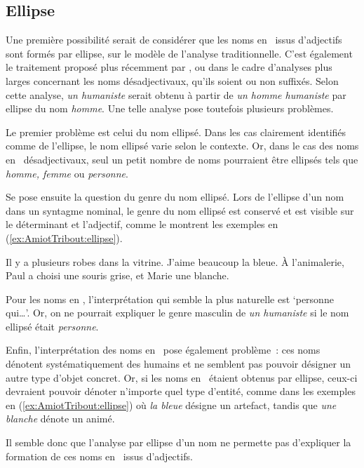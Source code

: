 \documentclass[output=paper]{LSP/langsci}
\begin{document}
\subsection{Ellipse}
Une première possibilité serait de considérer que les noms en \iste\ issus d'adjectifs sont formés par ellipse, sur le modèle de l'analyse traditionnelle. C'est également le traitement proposé plus récemment par \citet{borerroy10}, \citet{alexiadou13} ou \citet{mcnallydeswart15} dans le cadre d'analyses plus larges concernant les noms désadjectivaux, qu'ils soient ou non suffixés. Selon cette analyse, \textit{un humaniste} serait obtenu à partir de \textit{un homme humaniste} par ellipse du nom \textit{homme}. Une telle analyse pose toutefois plusieurs problèmes.

Le premier problème est celui du nom ellipsé. Dans les cas clairement identifiés comme de l'ellipse, le nom ellipsé varie selon le contexte. Or, dans le cas des noms en \iste\ désadjectivaux, seul un petit nombre de noms pourraient être ellipsés tels que \textit{homme, femme} ou \textit{personne}.

Se pose ensuite la question du genre du nom ellipsé. Lors de l'ellipse d'un nom dans un syntagme nominal, le genre du nom ellipsé est conservé et est visible  sur le déterminant et l'adjectif, comme le montrent les exemples en (\ref{ex:AmiotTribout:ellipse}).

\begin{exe}
\ex \label{ex:AmiotTribout:ellipse}
\begin{xlist}
\ex Il y a plusieurs robes dans la vitrine. J'aime beaucoup la bleue.
\ex À l'animalerie, Paul a choisi une souris grise, et Marie une blanche.
\end{xlist}
\end{exe}
Pour les noms en \iste, l'interprétation qui semble la plus naturelle est `personne qui\ldots '. Or, on ne pourrait expliquer le genre masculin de \textit{un humaniste} si le nom ellipsé était \textit{personne}.

Enfin, l'interprétation des noms en \iste\ pose également problème~: ces noms dénotent systématiquement des humains et ne semblent pas pouvoir désigner un autre type d'objet concret. Or, si les noms en \iste\ étaient obtenus par ellipse, ceux-ci devraient pouvoir dénoter n'importe quel type d'entité, comme dans les exemples en (\ref{ex:AmiotTribout:ellipse}) où \textit{la bleue} désigne un artefact, tandis que \textit{une blanche} dénote un animé.

Il semble donc que l'analyse par ellipse d'un nom ne permette pas d'expliquer la formation de ces noms  en \iste\ issus d'adjectifs.
\end{document}
